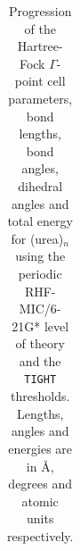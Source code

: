 \documentclass[prl,preprint,doublespace]{revtex4} %
\begin{document}
\begin{table}[t]
  \centering
  \caption{\protect
    Progression of the Hartree-Fock $\Gamma$-point cell parameters, 
    bond lengths, bond angles, dihedral angles 
    and total energy for (urea)$_n$ using the periodic RHF-MIC/6-21G* level of theory 
    and the {\tt TIGHT} thresholds. 
    Lengths, angles and energies are in \AA, degrees and atomic units respectively.
  }\label{Tab:Urea}
  \begin{tabular}{lccc}

\end{tabular}
\end{table}
\end{document}
